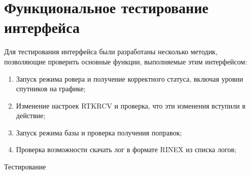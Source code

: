 \section{Функциональное тестирование интерфейса} \label{sect4_2}

Для тестирования интерфейса были разработаны несколько методик, позволяющие проверить основные функции, выполняемые этим интерфейсом:

\begin{enumerate}
  \item Запуск режима ровера и получение корректного статуса, включая уровни спутников на графике;
  \item Изменение настроек RTKRCV и проверка, что эти изменения вступили в действие;
  \item Запуск режима базы и проверка получения поправок;
  \item Проверка возможности скачать лог в формате RINEX из списка логов;
\end{enumerate}

Тестирование



















